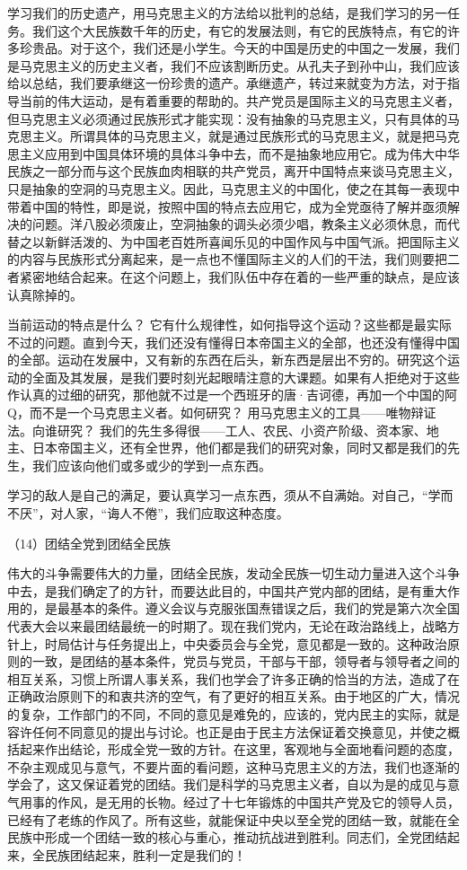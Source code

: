 \documentclass[UTF8, 12pt, a4paper]{ctexrep}
\begin{document}
学习我们的历史遗产，用马克思主义的方法给以批判的总结，是我们学习的另一任务。我们这个大民族数千年的历史，有它的发展法则，有它的民族特点，有它的许多珍贵品。对于这个，我们还是小学生。今天的中国是历史的中国之一发展，我们是马克思主义的历史主义者，我们不应该割断历史。从孔夫子到孙中山，我们应该给以总结，我们要承继这一份珍贵的遗产。承继遗产，转过来就变为方法，对于指导当前的伟大运动，是有着重要的帮助的。共产党员是国际主义的马克思主义者，但马克思主义必须通过民族形式才能实现：没有抽象的马克思主义，只有具体的马克思主义。所谓具体的马克思主义，就是通过民族形式的马克思主义，就是把马克思主义应用到中国具体环境的具体斗争中去，而不是抽象地应用它。成为伟大中华民族之一部分而与这个民族血肉相联的共产党员，离开中国特点来谈马克思主义，只是抽象的空洞的马克思主义。因此，马克思主义的中国化，使之在其每一表现中带着中国的特性，即是说，按照中国的特点去应用它，成为全党亟待了解并亟须解决的问题。洋八股必须废止，空洞抽象的调头必须少唱，教条主义必须休息，而代替之以新鲜活泼的、为中国老百姓所喜闻乐见的中国作风与中国气派。把国际主义的内容与民族形式分离起来，是一点也不懂国际主义的人们的干法，我们则要把二者紧密地结合起来。在这个问题上，我们队伍中存在着的一些严重的缺点，是应该认真除掉的。

当前运动的特点是什么？ 它有什么规律性，如何指导这个运动？这些都是最实际不过的问题。直到今天，我们还没有懂得日本帝国主义的全部，也还没有懂得中国的全部。运动在发展中，又有新的东西在后头，新东西是层出不穷的。研究这个运动的全面及其发展，是我们要时刻光起眼晴注意的大课题。如果有人拒绝对于这些作认真的过细的研究，那他就不过是一个西班牙的唐·吉诃德，再加一个中国的阿Q，而不是一个马克思主义者。如何研究？ 用马克思主义的工具——唯物辩证法。向谁研究？ 我们的先生多得很——工人、农民、小资产阶级、资本家、地主、日本帝国主义，还有全世界，他们都是我们的研究对象，同时又都是我们的先生，我们应该向他们或多或少的学到一点东西。

学习的敌人是自己的满足，要认真学习一点东西，须从不自满始。对自己，“学而不厌”，对人家，“诲人不倦”，我们应取这种态度。

（14）团结全党到团结全民族

伟大的斗争需要伟大的力量，团结全民族，发动全民族一切生动力量进入这个斗争中去，是我们确定了的方针，而要达此目的，中国共产党内部的团结，是有重大作用的，是最基本的条件。遵义会议与克服张国焘错误之后，我们的党是第六次全国代表大会以来最团结最统一的时期了。现在我们党内，无论在政治路线上，战略方针上，时局估计与任务提出上，中央委员会与全党，意见都是一致的。这种政治原则的一致，是团结的基本条件，党员与党员，干部与干部，领导者与领导者之间的相互关系，习惯上所谓人事关系，我们也学会了许多正确的恰当的方法，造成了在正确政治原则下的和衷共济的空气，有了更好的相互关系。由于地区的广大，情况的复杂，工作部门的不同，不同的意见是难免的，应该的，党内民主的实际，就是容许任何不同意见的提出与讨论。也正是由于民主方法保证着交换意见，并使之概括起来作出结论，形成全党一致的方针。在这里，客观地与全面地看问题的态度，不杂主观成见与意气，不要片面的看问题，这种马克思主义的方法，我们也逐渐的学会了，这又保证着党的团结。我们是科学的马克思主义者，自以为是的成见与意气用事的作风，是无用的长物。经过了十七年锻炼的中国共产党及它的领导人员，已经有了老练的作风了。所有这些，就能保证中央以至全党的团结一致，就能在全民族中形成一个团结一致的核心与重心，推动抗战进到胜利。同志们，全党团结起来，全民族团结起来，胜利一定是我们的！
\end{document}
